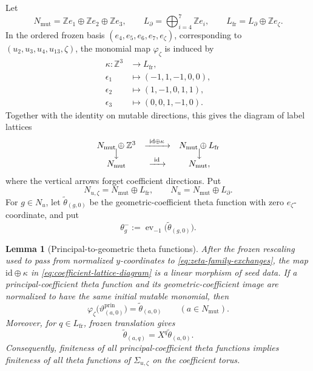 \documentclass[11pt,reqno]{amsart}
\numberwithin{equation}{section}
\newtheorem{lemma}[lemma]{Lemma}
\theoremstyle{remark}
\newcommand{\ZZ}{\mathbb{Z}}
\begin{document}
Let
\[ N_{\mathrm{mut}}=\ZZ e_1\oplus\ZZ e_2\oplus\ZZ e_3, \qquad L_\partial=\bigoplus_{i=4}^7\ZZ e_i, \qquad L_{\mathrm{fr}}=L_\partial\oplus\ZZ e_\zeta. \]
In the ordered frozen basis
$(e_4,e_5,e_6,e_7,e_\zeta)$, corresponding to
$(u_2,u_3,u_4,u_{13},\zeta)$, the monomial map
$\varphi_\zeta$ is induced by
\begin{equation}
\label{eq:coefficient-exponent-map}
 \begin{aligned}
 \kappa:\ZZ^3&\longrightarrow L_{\mathrm{fr}},\\
 \epsilon_1&\longmapsto(-1,1,-1,0,0),\\
 \epsilon_2&\longmapsto(1,-1,0,1,1),\\
 \epsilon_3&\longmapsto(0,0,1,-1,0).
 \end{aligned}
\end{equation}
Together with the identity on mutable directions, this gives the diagram of
label lattices
\begin{equation}
\label{eq:coefficient-lattice-diagram}
 \begin{array}{ccc}
 N_{\mathrm{mut}}\oplus\ZZ^3
 &\xrightarrow{\ \mathrm{id}\oplus\kappa\ }&
 N_{\mathrm{mut}}\oplus L_{\mathrm{fr}}\\[-1mm]
 \big\downarrow&&\big\downarrow\\[-1mm]
 N_{\mathrm{mut}}&\xrightarrow{\ \mathrm{id}\ }&N_{\mathrm{mut}},
 \end{array}
\end{equation}
where the vertical arrows forget coefficient directions.  Put
\[
 N_{u,\zeta}=N_{\mathrm{mut}}\oplus L_{\mathrm{fr}},
 \qquad
 N_u=N_{\mathrm{mut}}\oplus L_\partial.
\]
For $g\in N_u$, let $\widetilde\theta_{(g,0)}$ be the geometric-coefficient
theta function with zero $e_\zeta$-coordinate, and put
\[ \theta_g^-:=\operatorname{ev}_{-1} \bigl(\widetilde\theta_{(g,0)}\bigr). \]

\begin{lemma}[Principal-to-geometric theta functions]
\label{lem:principal-to-geometric-theta}
After the frozen rescaling used to pass from normalized $y$-coordinates to
\eqref{eq:zeta-family-exchanges}, the map
$\mathrm{id}\oplus\kappa$ in
\eqref{eq:coefficient-lattice-diagram} is a linear morphism of seed data.
If a principal-coefficient theta function and its geometric-coefficient image
are normalized to have the same initial mutable monomial, then
\begin{equation}
\label{eq:principal-geometric-theta-map}
 \varphi_\zeta\bigl(\vartheta^{\mathrm{prin}}_{(a,0)}\bigr)
 =\widetilde\theta_{(a,0)}
 \qquad(a\in N_{\mathrm{mut}}).
\end{equation}
Moreover, for $q\in L_{\mathrm{fr}}$, frozen translation gives
\begin{equation}
\label{eq:frozen-theta-translation}
 \widetilde\theta_{(a,q)}=X^q\widetilde\theta_{(a,0)}.
\end{equation}
Consequently, finiteness of all principal-coefficient theta functions implies
finiteness of all theta functions of $\Sigma_{u,\zeta}$ on the coefficient
torus.
\end{lemma}
\end{document}
